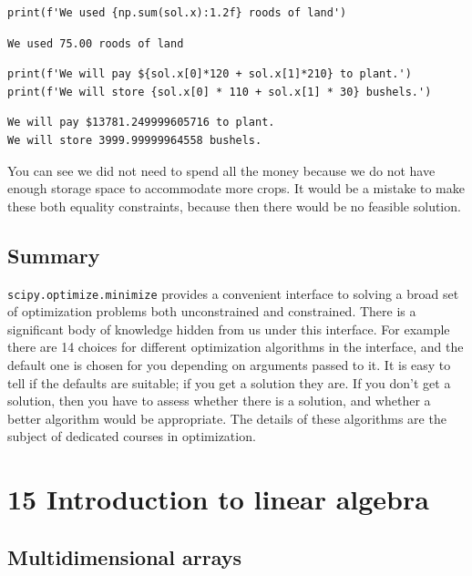 \documentclass[11pt]{article}
\begin{document}
\begin{verbatim}
print(f'We used {np.sum(sol.x):1.2f} roods of land')
\end{verbatim}

\begin{verbatim}
We used 75.00 roods of land

\end{verbatim}


\begin{verbatim}
print(f'We will pay ${sol.x[0]*120 + sol.x[1]*210} to plant.')
print(f'We will store {sol.x[0] * 110 + sol.x[1] * 30} bushels.')
\end{verbatim}

\begin{verbatim}
We will pay $13781.249999605716 to plant.
We will store 3999.99999964558 bushels.

\end{verbatim}

You can see we did not need to spend all the money because we do not have enough storage space to accommodate more crops. It would be a mistake to make these both equality constraints, because then there would be no feasible solution.
\subsection{Summary}
\label{sec:orgd6b5e79}

\texttt{scipy.optimize.minimize} provides a convenient interface to solving a broad set of optimization problems both unconstrained and constrained. There is a significant body of knowledge hidden from us under this interface. For example there are 14 choices for different optimization algorithms in the interface, and the default one is chosen for you depending on arguments passed to it. It is easy to tell if the defaults are suitable; if you get a solution they are. If you don't get a solution, then you have to assess whether there is a solution, and whether a better algorithm would be appropriate. The details of these algorithms are the subject of dedicated courses in optimization.


\section{15 Introduction to linear algebra}
\label{sec:org62ddc5c}

\subsection{Multidimensional arrays}
\label{sec:orgdd82d92}
\end{document}
